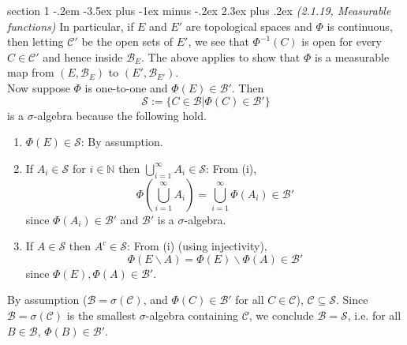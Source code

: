\documentclass[12pt]{article}
\makeatletter
\theoremstyle{norm}
\newcommand{\N}[0]{\mathbb{N}}
\providecommand{\cal}[1]{\mathcal{#1}}
\renewcommand{\cal}[1]{\mathcal{#1}}
\newcommand{\subeq}[0]{\subseteq}
\newcommand{\si}[0]{\sigma}
\newcommand{\pa}[1]{\left( {#1} \right)}
\newcommand{\bs}[0]{\backslash}
\newcommand{\sia}[0]{ $\si$-algebra}
\newenvironment{problem}{\@startsection
       {section}
       {1}
       {-.2em}
       {-3.5ex plus -1ex minus -.2ex}
       {2.3ex plus .2ex}
       {\pagebreak[3]%
       \large\bf\noindent{Problem }
       }
       }
       {%
       }
\makeatother
\begin{document}
\begin{problem}{\it (2.1.19, Measurable functions)}
In particular, if $E$ and $E'$ are topological spaces and $\Phi$ is continuous, then letting $\cal C'$ be the open sets of $E'$, we see that $\Phi^{-1}(C)$ is open for every $C\in \cal C'$ and hence inside $\cal B_E$. The above applies to show that $\Phi$ is a measurable map from $(E,\cal B_E)$ to $(E',\cal B_{E'})$.\\

Now suppose $\Phi$ is one-to-one and $\Phi(E)\in \cal B'$. Then
\[
\cal S:=\{C\in \cal B|\Phi(C)\in \cal B'\}
\]
is a $\sigma$-algebra because the following hold.
\begin{enumerate}
\item $\Phi(E)\in \cal S$: By assumption.
\item If $A_i\in \cal S$ for $i\in \N$ then $\bigcup_{i=1}^{\infty} A_i\in \cal S$: From (i),
\[
\Phi\pa{\bigcup_{i=1}^{\infty} A_i}=\bigcup_{i=1}^{\infty} \Phi(A_i)\in \cal B'
\]
since $\Phi(A_i)\in \cal B'$ and $\cal B'$ is a \sia.
\item If $A\in \cal S$ then $A^c\in \cal S$: From (i) (using injectivity),
\[
\Phi(E\bs A)=\Phi(E)\bs \Phi(A)\in \cal B'
\]
since $\Phi(E),\Phi(A)\in \cal B'$.
\end{enumerate}
By assumption ($\cal B=\sigma(\cal C)$, and $\Phi(C)\in \cal B'$ for all $C\in \cal C$), $\cal C\subeq \cal S$. Since $\cal B=\si(\cal C)$ is the smallest \sia{} containing $\cal C$, we conclude $\cal B=\cal S$, i.e. for all $B\in \cal B$, $\Phi(B)\in \cal B'$.\\


\end{problem}
\end{document}
